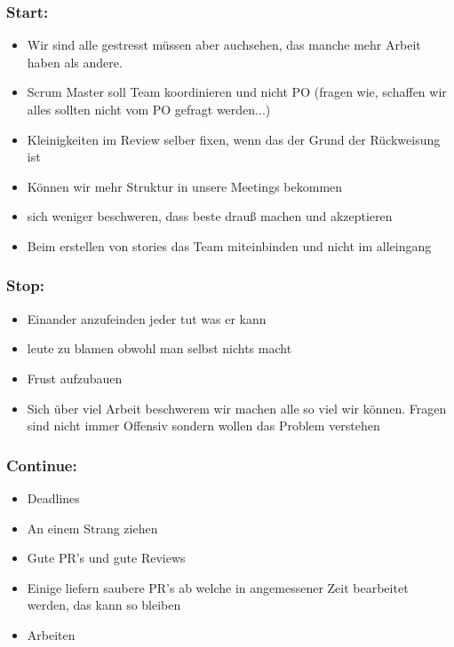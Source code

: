 \subsubsection{Start:}
\begin{itemize}
    \item Wir sind alle gestresst müssen aber auchsehen, das manche mehr Arbeit haben als andere.
    \item Scrum Master soll Team koordinieren und nicht PO (fragen wie, schaffen wir alles sollten nicht vom PO gefragt werden...)
    \item Kleinigkeiten im Review selber fixen, wenn das der Grund der Rückweisung ist
    \item Können wir mehr Struktur in unsere Meetings bekommen
    \item sich weniger beschweren, dass beste drauß machen und akzeptieren
    \item Beim erstellen von stories das Team miteinbinden und nicht im alleingang
\end{itemize}

\subsubsection{Stop:}
\begin{itemize}
    \item Einander anzufeinden jeder tut was er kann
    \item leute zu blamen obwohl man selbst nichts macht
    \item Frust aufzubauen
    \item Sich über viel Arbeit beschwerem wir machen alle so viel wir können. Fragen sind nicht immer Offensiv sondern wollen das Problem verstehen
\end{itemize}

\subsubsection{Continue:}
\begin{itemize}
    \item Deadlines
    \item An einem Strang ziehen
    \item Gute PR's und gute Reviews
    \item Einige liefern saubere PR's ab welche in angemessener Zeit bearbeitet werden, das kann so bleiben
    \item Arbeiten
\end{itemize}

